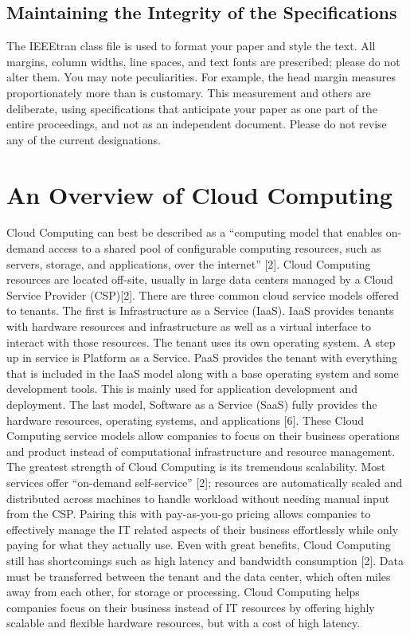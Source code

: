 \documentclass[conference]{IEEEtran}
\begin{document}
\subsection{Maintaining the Integrity of the Specifications}

The IEEEtran class file is used to format your paper and style the text. All margins, 
column widths, line spaces, and text fonts are prescribed; please do not 
alter them. You may note peculiarities. For example, the head margin
measures proportionately more than is customary. This measurement 
and others are deliberate, using specifications that anticipate your paper 
as one part of the entire proceedings, and not as an independent document. 
Please do not revise any of the current designations.

\section{An Overview of Cloud Computing}
Cloud Computing can best be described as a “computing model that enables on-demand access to a shared pool of configurable computing resources, such as servers, storage, and applications, over the internet” [2]. Cloud Computing resources are located off-site, usually in large data centers managed by a Cloud Service Provider (CSP)[2]. There are three common cloud service models offered to tenants. The first is Infrastructure as a Service (IaaS). IaaS provides tenants with hardware resources and infrastructure as well as a virtual interface to interact with those resources. The tenant uses its own operating system. A step up in service is Platform as a Service. PaaS provides the tenant with everything that is included in the IaaS model along with a base operating system and some development tools. This is mainly used for application development and deployment. The last model, Software as a Service (SaaS) fully provides the hardware resources, operating systems, and applications [6]. These Cloud Computing service models allow companies to focus on their business operations and product instead of computational infrastructure and resource management.
The greatest strength of Cloud Computing is its tremendous scalability. Most services offer “on-demand self-service” [2]; resources are automatically scaled and distributed across machines to handle workload without needing manual input from the CSP. Pairing this with pay-as-you-go pricing allows companies to effectively manage the IT related aspects of their business effortlessly while only paying for what they actually use. Even with great benefits, Cloud Computing still has shortcomings such as high latency and bandwidth consumption [2]. Data must be transferred between the tenant and the data center, which often miles away from each other, for storage or processing. Cloud Computing helps companies focus on their business instead of IT resources by offering highly scalable and flexible hardware resources, but with a cost of high latency.
\end{document}
